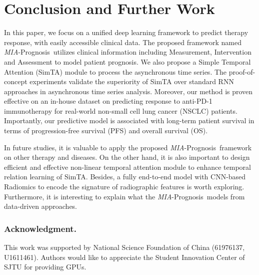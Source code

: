 \documentclass[runningheads]{llncs}
\newcommand{\miap}{\emph{MIA}-Prognosis}
\begin{document}
\section{Conclusion and Further Work}

In this paper, we focus on a unified deep learning framework to predict therapy response, with easily accessible clinical data. The proposed framework named \miap~utilizes clinical information including Measurement, Intervention and Assessment to model patient prognosis. We also propose a Simple Temporal Attention (SimTA) module to process the asynchronous time series. The proof-of-concept experiments validate the superiority of SimTA over standard RNN approaches in asynchronous time series analysis. Moreover, our method is proven effective on an in-house dataset on predicting response to anti-PD-1 immunotherapy for real-world non-small cell lung cancer (NSCLC) patients. Importantly, our predictive model is associated with long-term patient survival in terms of progression-free survival (PFS) and overall survival (OS).

In future studies, it is valuable to apply the proposed \miap~framework on other therapy and diseases. On the other hand, it is also important to design efficient and effective non-linear temporal attention module to enhance temporal relation learning of SimTA. Besides, a fully end-to-end model with CNN-based Radiomics \cite{yang2019probabilistic} to encode the signature of radiographic features is worth exploring. Furthermore, it is interesting to explain what the \miap~models from data-driven approaches.

\subsubsection{Acknowledgment.}
This work was supported by National Science Foundation of China (61976137, U1611461). Authors would like to appreciate the Student Innovation Center of SJTU for providing GPUs.
\end{document}
